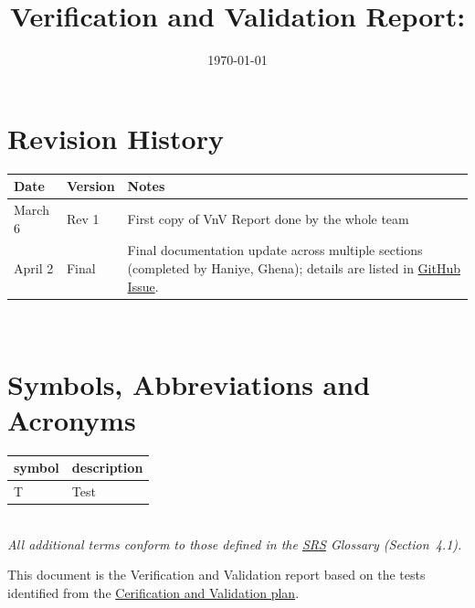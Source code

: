 \documentclass[12pt, titlepage]{article}
\begin{document}
\title{Verification and Validation Report: \progname}
\author{\authname}
\date{\today}

\maketitle


\section{Revision History}

\begin{tabularx}{\textwidth}{p{3cm}p{2cm}X}
\toprule {\bf Date} & {\bf Version} & {\bf Notes}\\
\midrule
March 6 & Rev 1 & First copy of VnV Report done by the whole team\\
April 2 & Final & Final documentation update across multiple sections (completed by Haniye, Ghena); details are listed in \href{https://github.com/thaafei/DomainX/issues/537}{GitHub Issue}.\\
\bottomrule
\end{tabularx}

~\newpage

\section{Symbols, Abbreviations and Acronyms}

\renewcommand{\arraystretch}{1.2}
\begin{tabular}{l l}
  \toprule
  \textbf{symbol} & \textbf{description}\\
  \midrule
  T & Test\\
  \bottomrule
\end{tabular}\\

\noindent\textit{All additional terms conform to those defined in the \href{https://github.com/thaafei/DomainX/blob/main/docs/SRS/SRS.pdf}{SRS} Glossary (Section~4.1).}
\newpage

\tableofcontents

\listoftables %

\newpage

This document is the Verification and Validation report based on the tests identified from the \href{https://github.com/thaafei/DomainX/blob/main/docs/VnVPlan/VnVPlan.pdf}{Cerification and Validation plan}.
\end{document}
